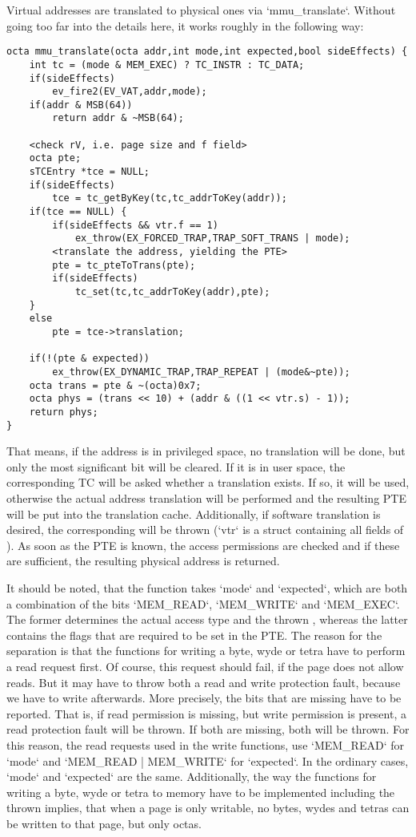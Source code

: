 Virtual addresses are translated to physical ones via `mmu_translate`. Without going too far into the details here, it works roughly in the following way:
\begin{lstlisting}[language=GIMMIXC,caption={Implementation of {\tt mmu\_translate} (partially pseudo-code)}]
octa mmu_translate(octa addr,int mode,int expected,bool sideEffects) {
	int tc = (mode & MEM_EXEC) ? TC_INSTR : TC_DATA;
	if(sideEffects)
		ev_fire2(EV_VAT,addr,mode);
	if(addr & MSB(64))
		return addr & ~MSB(64);
	
	<check rV, i.e. page size and f field>
	octa pte;
	sTCEntry *tce = NULL;
	if(sideEffects)
		tce = tc_getByKey(tc,tc_addrToKey(addr));
	if(tce == NULL) {
		if(sideEffects && vtr.f == 1)
			ex_throw(EX_FORCED_TRAP,TRAP_SOFT_TRANS | mode);
		<translate the address, yielding the PTE>
		pte = tc_pteToTrans(pte);
		if(sideEffects)
			tc_set(tc,tc_addrToKey(addr),pte);
	}
	else
		pte = tce->translation;

	if(!(pte & expected))
		ex_throw(EX_DYNAMIC_TRAP,TRAP_REPEAT | (mode&~pte));
	octa trans = pte & ~(octa)0x7;
	octa phys = (trans << 10) + (addr & ((1 << vtr.s) - 1));
	return phys;
}
\end{lstlisting}
That means, if the address is in privileged space, no translation will be done, but only the most significant bit will be cleared. If it is in user space, the corresponding TC will be asked whether a translation exists. If so, it will be used, otherwise the actual address translation will be performed and the resulting PTE will be put into the translation cache. Additionally, if software translation is desired, the corresponding  will be thrown (`vtr` is a struct containing all fields of ). As soon as the PTE is known, the access permissions are checked and if these are sufficient, the resulting physical address is returned.

It should be noted, that the function takes `mode` and `expected`, which are both a combination of the bits `MEM_READ`, `MEM_WRITE` and `MEM_EXEC`. The former determines the actual access type and the thrown , whereas the latter contains the flags that are required to be set in the PTE. The reason for the separation is that the functions for writing a byte, wyde or tetra have to perform a read request first. Of course, this request should fail, if the page does not allow reads. But it may have to throw both a read and write protection fault, because we have to write afterwards. More precisely, the bits that are missing have to be reported. That is, if read permission is missing, but write permission is present, a read protection fault will be thrown. If both are missing, both will be thrown. For this reason, the read requests used in the write functions, use `MEM_READ` for `mode` and `MEM_READ | MEM_WRITE` for `expected`. In the ordinary cases, `mode` and `expected` are the same. Additionally, the way the functions for writing a byte, wyde or tetra to memory have to be implemented including the thrown  implies, that when a page is only writable, no bytes, wydes and tetras can be written to that page, but only octas.

